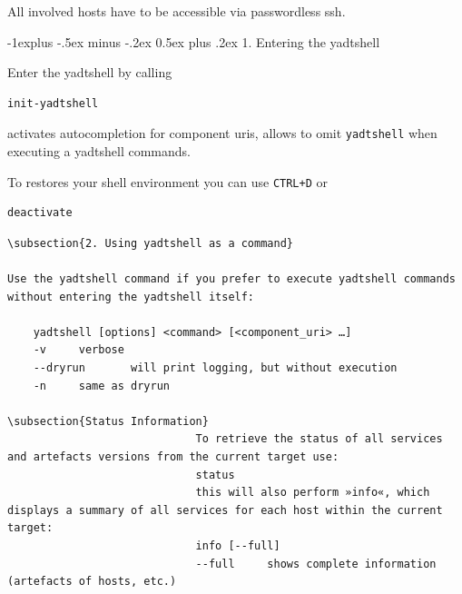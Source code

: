 \documentclass[10pt,landscape]{article}
\makeatletter
\renewcommand{\subsection}{\@startsection{subsection}{2}{0mm}%
                                {-1explus -.5ex minus -.2ex}%
                                {0.5ex plus .2ex}%
                                {\normalfont\normalsize\bfseries}}
\makeatother
\begin{document}
\begin{multicols}{3}
All involved hosts have to be accessible via passwordless ssh.

\subsection{1. Entering the yadtshell}

Enter the yadtshell by calling

\begin{lstlisting}
init-yadtshell
\end{lstlisting}

activates autocompletion for component uris,
allows to omit \verb#yadtshell# when executing a yadtshell commands.

To restores your shell environment you can use \verb#CTRL+D# or

\begin{lstlisting}
deactivate
\end{lstlisting}

\pagebreak\begin{verbatim}
\subsection{2. Using yadtshell as a command}

Use the yadtshell command if you prefer to execute yadtshell commands
without entering the yadtshell itself:

    yadtshell [options] <command> [<component_uri> …]
    -v     verbose
    --dryrun       will print logging, but without execution
    -n     same as dryrun

\subsection{Status Information}
                             To retrieve the status of all services and artefacts versions from the current target use:
                             status
                             this will also perform »info«, which displays a summary of all services for each host within the current target:
                             info [--full]
                             --full     shows complete information (artefacts of hosts, etc.)


\end{verbatim}
\end{multicols}
\end{document}
